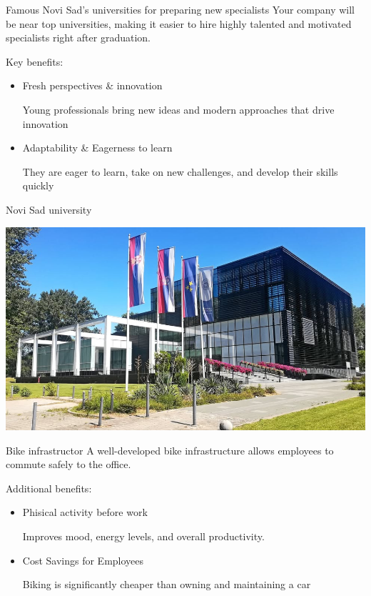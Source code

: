 \documentclass[presentation]{beamer}
\begin{document}
\begin{frame}[label={sec:orgb39472b}]{Famous Novi Sad's universities for preparing new specialists}
Your company will be near top universities, making it easier to hire highly talented and motivated specialists right after graduation.

Key benefits:
\begin{itemize}
\item Fresh perspectives \& innovation

Young professionals bring new ideas and modern approaches that drive innovation
\item Adaptability \& Eagerness to learn

They are eager to learn, take on new challenges, and develop their skills quickly
\end{itemize}
\end{frame}
\begin{frame}[label={sec:org80b33d7}]{Novi Sad university}
\begin{center}
\includegraphics[width=.9\linewidth]{NoviSadUniversity.jpg}
\end{center}
\end{frame}
\begin{frame}[label={sec:org92bcdd3}]{Bike infrastructor}
A well-developed bike infrastructure allows employees to commute safely to the office.

Additional benefits:
\begin{itemize}
\item Phisical activity before work

Improves mood, energy levels, and overall productivity.
\item Cost Savings for Employees

Biking is significantly cheaper than owning and maintaining a car
\end{itemize}
\end{frame}
\end{document}
